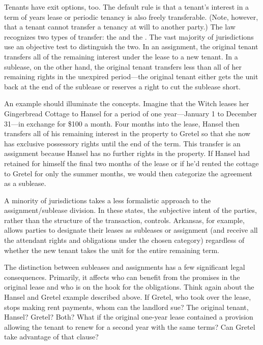 Tenants have exit options, too.  The default rule is that a tenant's interest in
a term of years lease or periodic tenancy is also freely transferable.  (Note,
however, that a tenant cannot transfer a tenancy at will to another party.) 
The law recognizes two types of transfer: the  and
the .  The vast majority of jurisdictions use an objective
test to distinguish the two.  In an assignment, the original tenant transfers
all of the remaining interest under the lease to a new tenant.  In a sublease,
on the other hand, the original tenant transfers less than all of her remaining
rights in the unexpired period---the original tenant either gets the unit back
at the end of the sublease or reserves a right to cut the sublease short.  

An example should illuminate the concepts.  Imagine that the Witch leases her
Gingerbread Cottage to Hansel for a period of one year---January 1 to December
31---in exchange for \$100 a month.  Four months into the lease, Hansel then
transfers all of his remaining interest in the property to Gretel so that she
now has exclusive possessory rights until the end of the term.  This transfer
is an assignment because Hansel has no further rights in the property.  If
Hansel had retained for himself the final two months of the lease or if he'd
rented the cottage to Gretel for only the summer months, we would then
categorize the agreement as a sublease.


A minority of jurisdictions takes a less formalistic approach to the
assignment/sublease division.  In these states, the subjective intent of the
parties, rather than the structure of the transaction, controls.  Arkansas, for
example, allows parties to designate their leases as subleases or assignment
(and receive all the attendant rights and obligations under the chosen
category) regardless of whether the new tenant takes the unit for the entire
remaining term.  

The distinction between subleases and assignments has a few significant legal
consequences.  Primarily, it affects who can benefit from the promises in the
original lease and who is on the hook for the obligations.  Think again about
the Hansel and Gretel example described above.  If Gretel, who took over the
lease, stops making rent payments, whom can the landlord sue?  The original
tenant, Hansel?  Gretel?  Both?  What if the original one-year lease contained
a provision allowing the tenant to renew for a second year with the same terms?
 Can Gretel take advantage of that clause?  

